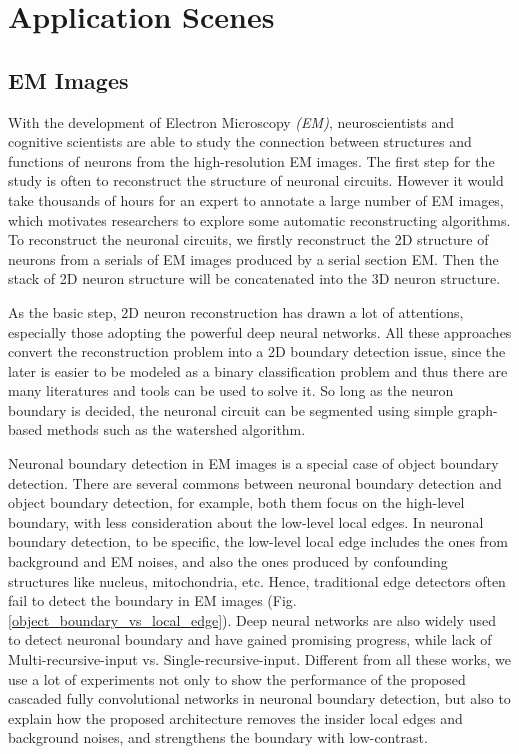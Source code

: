 \documentclass[senior]{IPSstyle}
\begin{document}


\section{Application Scenes}

\subsection{EM Images}
With the development of Electron Microscopy \emph{(EM)}, neuroscientists and cognitive scientists are able to study the connection between structures and functions of neurons from the high-resolution EM images\cite{Lichtman2011}. The first step for the study is often to reconstruct the structure of neuronal circuits. However it would take thousands of hours for an expert to annotate a large number of EM images, which motivates researchers to explore some automatic reconstructing algorithms. To reconstruct the neuronal circuits, we firstly reconstruct the 2D structure of neurons from a serials of EM images produced by a serial section EM. Then the stack of 2D neuron structure will be concatenated into the 3D neuron structure. 

As the basic step, 2D neuron reconstruction has drawn a lot of attentions, especially those adopting the powerful deep neural networks\cite{Ciresan2012, Lee2015, Quan2016}. All these approaches convert the reconstruction problem into a 2D boundary detection issue, since the later is easier to be modeled as a binary classification problem and thus there are many literatures and tools can be used to solve it. So long as the neuron boundary is decided, the neuronal circuit can be segmented using simple graph-based methods such as the watershed algorithm\cite{Zlateski2015}. 

Neuronal boundary detection in EM images is a special case of object boundary detection. There are several commons between neuronal boundary detection and object boundary detection, for example, both them focus on the high-level boundary, with less consideration about the low-level local edges. In neuronal boundary detection, to be specific, the low-level local edge includes the ones from background and EM noises, and also the ones produced by confounding structures like nucleus, mitochondria, etc. Hence, traditional edge detectors\cite{Xie2015, Canny1986, Sobel2014} often fail to detect the boundary in EM images (Fig. \ref{object_boundary_vs_local_edge}). Deep neural networks are also widely used to detect neuronal boundary and have gained promising progress\cite{Ciresan2012, Lee2015}, while lack of Multi-recursive-input vs. Single-recursive-input. Different from all these works, we use a lot of experiments not only to show the performance of the proposed cascaded fully convolutional networks in neuronal boundary detection, but also to explain how the proposed architecture removes the insider local edges and background noises, and strengthens the boundary with low-contrast.
\end{document}
